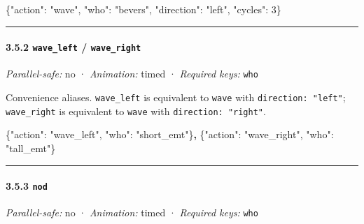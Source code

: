 \documentclass[
  12pt,
  letterpaper,
]{book}
\newenvironment{Shaded}{}{}
\newcommand{\DataTypeTok}[1]{\textcolor[rgb]{0.56,0.13,0.00}{#1}}
\newcommand{\DecValTok}[1]{\textcolor[rgb]{0.25,0.63,0.44}{#1}}
\newcommand{\ErrorTok}[1]{\textcolor[rgb]{1.00,0.00,0.00}{\textbf{#1}}}
\newcommand{\FunctionTok}[1]{\textcolor[rgb]{0.02,0.16,0.49}{#1}}
\newcommand{\StringTok}[1]{\textcolor[rgb]{0.25,0.44,0.63}{#1}}
\begin{document}
\begin{Shaded}
\begin{Highlighting}[]
\FunctionTok{\{}\DataTypeTok{"action"}\FunctionTok{:} \StringTok{"wave"}\FunctionTok{,} \DataTypeTok{"who"}\FunctionTok{:} \StringTok{"bevers"}\FunctionTok{,} \DataTypeTok{"direction"}\FunctionTok{:} \StringTok{"left"}\FunctionTok{,} \DataTypeTok{"cycles"}\FunctionTok{:} \DecValTok{3}\FunctionTok{\}}
\end{Highlighting}
\end{Shaded}

\begin{center}\rule{0.5\linewidth}{0.5pt}\end{center}

\paragraph{\texorpdfstring{3.5.2 \texttt{wave\_left} /
\texttt{wave\_right}}{3.5.2 wave\_left / wave\_right}}\label{wave_left-wave_right}

\emph{Parallel-safe:} no · \emph{Animation:} timed · \emph{Required
keys:} \texttt{who}

Convenience aliases. \texttt{wave\_left} is equivalent to \texttt{wave}
with \texttt{direction:\ "left"}; \texttt{wave\_right} is equivalent to
\texttt{wave} with \texttt{direction:\ "right"}.

\begin{Shaded}
\begin{Highlighting}[]
\FunctionTok{\{}\DataTypeTok{"action"}\FunctionTok{:} \StringTok{"wave\_left"}\FunctionTok{,}  \DataTypeTok{"who"}\FunctionTok{:} \StringTok{"short\_emt"}\FunctionTok{\}}\ErrorTok{,}
\FunctionTok{\{}\DataTypeTok{"action"}\FunctionTok{:} \StringTok{"wave\_right"}\FunctionTok{,} \DataTypeTok{"who"}\FunctionTok{:} \StringTok{"tall\_emt"}\FunctionTok{\}}
\end{Highlighting}
\end{Shaded}

\begin{center}\rule{0.5\linewidth}{0.5pt}\end{center}

\paragraph{\texorpdfstring{3.5.3 \texttt{nod}}{3.5.3 nod}}\label{nod}

\emph{Parallel-safe:} no · \emph{Animation:} timed · \emph{Required
keys:} \texttt{who}
\end{document}
